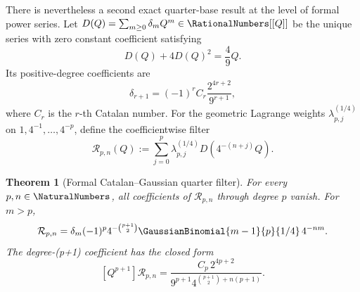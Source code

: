 \documentclass[11pt,oneside]{article}
\newtheorem{theorem}{Theorem}[section]
\theoremstyle{definition}
\theoremstyle{remark}
\begin{document}
There is nevertheless a second exact quarter-base result at the level of formal power
series.  Let \(D(Q)=\sum_{m\ge0}\delta_mQ^m\in\RationalNumbers[[Q]]\) be the unique series with
zero constant coefficient satisfying
\begin{equation}
 D(Q)+4D(Q)^2=\frac49Q.                                    \label{eq:quarter-catalan-formal-equation}
\end{equation}
Its positive-degree coefficients are
\begin{equation}
 \delta_{r+1}=(-1)^r C_r\frac{2^{4r+2}}{9^{r+1}},          \label{eq:quarter-catalan-formal-coefficients}
\end{equation}
where \(C_r\) is the \(r\)-th Catalan number.  For the geometric Lagrange weights
\(\lambda_{p,j}^{(1/4)}\) on \(1,4^{-1},\ldots,4^{-p}\), define the coefficientwise
filter
\begin{equation}
 \mathcal R_{p,n}(Q):=
 \sum_{j=0}^{p}\lambda_{p,j}^{(1/4)}D(4^{-(n+j)}Q).         \label{eq:quarter-catalan-richardson-filter}
\end{equation}

\begin{theorem}[Formal Catalan--Gaussian quarter filter]
\label{thm:quarter-catalan-richardson-filter}
For every \(p,n\in\NaturalNumbers\), all coefficients of
\(\mathcal R_{p,n}\) through degree \(p\) vanish.  For \(m>p\),
\begin{equation}
 [Q^m]\mathcal R_{p,n}
 =\delta_m(-1)^p4^{-\binom{p+1}{2}}
   \GaussianBinomial{m-1}{p}{1/4}\,4^{-nm}.                          \label{eq:quarter-catalan-filter-residual}
\end{equation}
The degree-(p+1) coefficient has the closed form
\begin{equation}
 \boxed{
 [Q^{p+1}]\mathcal R_{p,n}
 =\frac{C_p\,2^{4p+2}}
 {9^{p+1}4^{\binom{p+1}{2}+n(p+1)}}.}                      \label{eq:quarter-catalan-filter-leading}
\end{equation}
\end{theorem}
\end{document}
